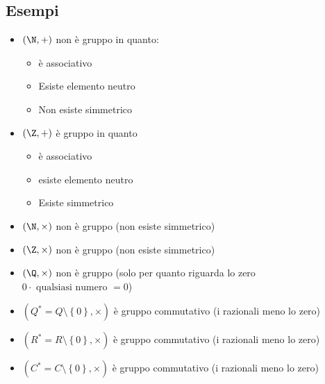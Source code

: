 \documentclass[12pt,a4paper,oneside]{article}
\begin{document}
\subsection{Esempi}
\label{sub:esempi}
\begin{itemize}
	\item $\left( \N, + \right) $ \rarr non è gruppo in quanto:
	      \begin{itemize}
		      \item è associativo
		      \item Esiste elemento neutro
		      \item Non esiste simmetrico
	      \end{itemize}
	      \item$ (\Z, +)$ \rarr è gruppo in quanto
	      \begin{itemize}
		      \item è associativo
		      \item esiste elemento neutro
		      \item Esiste simmetrico
	      \end{itemize}
	\item $ \left( \N, \times \right) $ \rarr non è gruppo (non esiste simmetrico)
	\item $\left( \Z, \times \right) $ \rarr non è gruppo (non esiste simmetrico)
	\item $ \left( \Q, \times \right) $ \rarr non è gruppo (solo per quanto riguarda lo zero $0 \cdot \text{ qualsiasi numero  }=0$)
	\item $\left( Q^* = Q \setminus \left\{ 0 \right\}, \times \right) $ \rarr è gruppo commutativo (i razionali meno lo zero)
	\item $\left( R^* = R \setminus \left\{ 0 \right\}, \times \right) $ \rarr è gruppo commutativo (i razionali meno lo zero)
	\item $\left( C^* = C \setminus \left\{ 0 \right\}, \times \right) $ \rarr è gruppo commutativo (i razionali meno lo zero)
\end{itemize}

\end{document}

